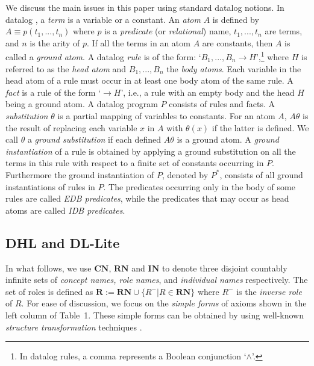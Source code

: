 \documentclass[final,1p,times]{elsarticle}
\begin{document}
We discuss the main issues in this paper using standard datalog notions.
In datalog \cite{database}, a \emph{term} is a variable or a constant. An \emph{atom} $A$
is defined by $A\equiv p(t_1,...,t_n)$ where $p$ is a \emph{predicate} (or \emph{relational})
name, $t_1,...,t_n$ are terms, and $n$ is the arity of $p$. If all the terms in an atom $A$ are
constants, then $A$ is called a \emph{ground atom}.
A datalog \emph{rule} is of the form: `$B_1,...,B_n\rightarrow H$',\footnote{In datalog rules, a comma
represents a Boolean conjunction `$\wedge$'.} where $H$ is referred to as
the \emph{head atom} and $B_1,...,B_n$ the \emph{body atoms}. Each variable in the head atom
of a rule must occur in at least one body atom of the same rule. A \emph{fact} is a rule of
the form `$\rightarrow H$', i.e., a rule with an empty body and the head $H$ being a ground atom.
A datalog program $P$ consists of rules and facts.
A \emph{substitution} $\theta$ is a partial mapping of variables to constants.
For an atom $A$, $A\theta$ is the result of replacing each variable $x$ in $A$
with $\theta(x)$ if the latter is defined. We call $\theta$ a \emph{ground substitution}
if each defined $A\theta$ is a ground atom.
A \emph{ground instantiation} of a rule is obtained by applying a ground substitution on all
the terms in this rule with respect to a finite set of constants occurring in $P$.
Furthermore the ground instantiation of $P$, denoted by $P^*$,
consists of all ground instantiations of rules in $P$.
The predicates occurring only in the body  of some rules are called \emph{EDB predicates},
while the predicates that may occur as head atoms are called \emph{IDB predicates}.


\subsection{DHL and DL-Lite}

In what follows, we use $\textbf{CN}$, $\textbf{RN}$ and $\textbf{IN}$
to denote three disjoint countably
infinite sets of \emph{concept names, role names}, and \emph{individual names} respectively.
The set of roles is defined as $\textbf{R}:=\textbf{RN}\cup\{R^-|R\in\textbf{RN}\}$
where $R^-$ is the \emph{inverse role} of $R$.
For ease of discussion, we focus on the \emph{simple forms} of axioms shown
in the left column of Table~1. These simple forms can be obtained by using
well-known \emph{structure transformation} techniques \cite{KrotzschRH07,Kazakov09}.
\end{document}
